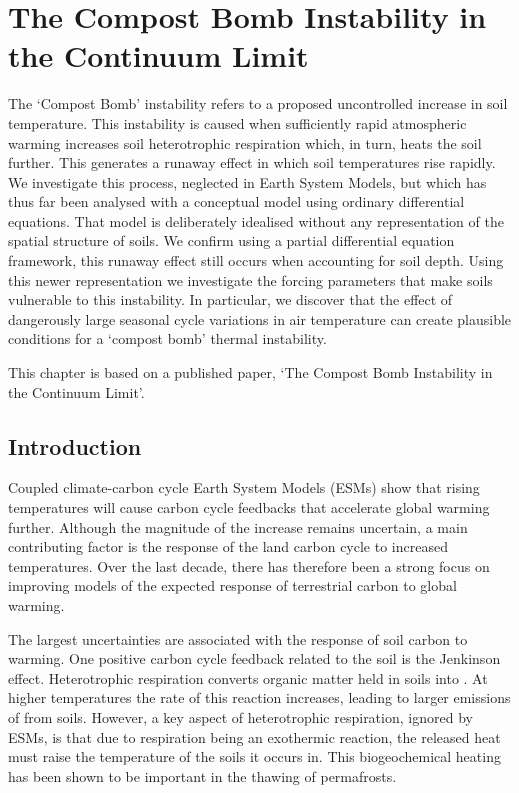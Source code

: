 \chapter{The Compost Bomb Instability in the Continuum Limit}
\label{chapter:continuous_compost_bomb}
\graphicspath{{continuous_compost_bomb/figs/}}
  The `Compost Bomb' instability refers to a proposed uncontrolled increase in soil temperature. This instability is caused when sufficiently rapid
  atmospheric warming increases soil heterotrophic respiration which, in turn, heats the soil further. This generates a runaway
  effect in which soil temperatures rise rapidly. We investigate this process, neglected in Earth System Models, but which has thus far been analysed with a conceptual
  model using ordinary differential equations. That model is deliberately idealised without any representation of the spatial structure of soils.
  We confirm using a partial differential equation framework, this runaway effect still occurs when accounting for soil depth.
  Using this newer representation we investigate the forcing parameters that make soils vulnerable to this instability. In particular, we discover that the effect of
  dangerously large seasonal cycle variations in air temperature can create plausible conditions for a `compost bomb' thermal instability.


This chapter is based on a published paper, `The Compost Bomb Instability in the Continuum Limit'\cite{Clarke2021}.

 \section{Introduction}
\label{section:compost_bomb_intro}
Coupled climate-carbon cycle Earth System Models (ESMs) show that rising temperatures will cause carbon cycle feedbacks that accelerate global
warming further\cite{Cox2000}. Although the magnitude of the increase remains uncertain, a main contributing factor is the
response of the land carbon cycle to increased temperatures\cite{Friedlingstein2006,Arora2020}. Over the last decade, there has therefore been a strong focus on improving
models of the expected response of terrestrial carbon to global warming.

The largest uncertainties are associated with the response of soil carbon to warming\cite{Varney2020}.
One positive carbon cycle feedback related to the soil is the Jenkinson effect\cite{Jenkinson1991}. Heterotrophic respiration converts
organic matter held in soils into . At higher temperatures the rate of this reaction increases, leading to
larger emissions of  from soils. However, a key aspect of heterotrophic respiration, ignored by ESMs\cite{Arora2020}, is that due to respiration being
an exothermic reaction, the released heat must raise the temperature of the soils it occurs in. This biogeochemical heating has been shown
to be important in the thawing of permafrosts\cite{Khvorostyanov2008,Khvorostyanov2008a}.

